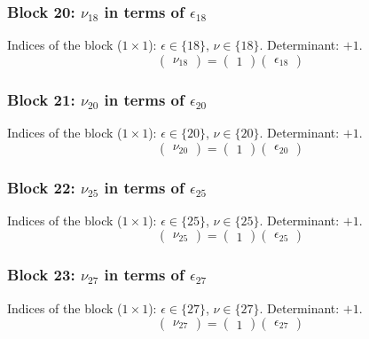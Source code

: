 \subsubsection{Block 20: $\nu_{18}$ in terms of $\epsilon_{18}$}
Indices of the block ($1\times 1$): $\epsilon \in \{18\}$, $\nu \in \{18\}$.
Determinant: $+1$.
\[
\begin{pmatrix}
\nu_{18}
\end{pmatrix}
=
\begin{pmatrix}
1
\end{pmatrix}
\begin{pmatrix}
\epsilon_{18}
\end{pmatrix}
\]

\subsubsection{Block 21: $\nu_{20}$ in terms of $\epsilon_{20}$}
Indices of the block ($1\times 1$): $\epsilon \in \{20\}$, $\nu \in \{20\}$.
Determinant: $+1$.
\[
\begin{pmatrix}
\nu_{20}
\end{pmatrix}
=
\begin{pmatrix}
1
\end{pmatrix}
\begin{pmatrix}
\epsilon_{20}
\end{pmatrix}
\]

\subsubsection{Block 22: $\nu_{25}$ in terms of $\epsilon_{25}$}
Indices of the block ($1\times 1$): $\epsilon \in \{25\}$, $\nu \in \{25\}$.
Determinant: $+1$.
\[
\begin{pmatrix}
\nu_{25}
\end{pmatrix}
=
\begin{pmatrix}
1
\end{pmatrix}
\begin{pmatrix}
\epsilon_{25}
\end{pmatrix}
\]

\subsubsection{Block 23: $\nu_{27}$ in terms of $\epsilon_{27}$}
Indices of the block ($1\times 1$): $\epsilon \in \{27\}$, $\nu \in \{27\}$.
Determinant: $+1$.
\[
\begin{pmatrix}
\nu_{27}
\end{pmatrix}
=
\begin{pmatrix}
1
\end{pmatrix}
\begin{pmatrix}
\epsilon_{27}
\end{pmatrix}
\]

